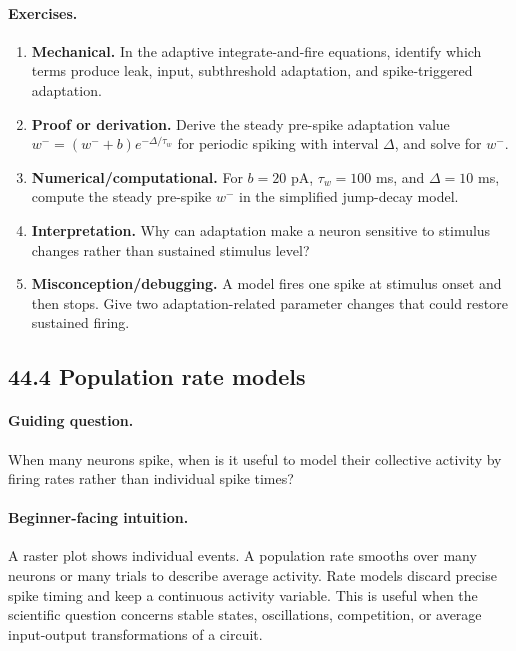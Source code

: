 \paragraph{Exercises.}
\begin{enumerate}[label=\textbf{44.3.\arabic*.}, leftmargin=*]
\item \textbf{Mechanical.} In the adaptive integrate-and-fire equations, identify which terms produce leak, input, subthreshold adaptation, and spike-triggered adaptation.
\item \textbf{Proof or derivation.} Derive the steady pre-spike adaptation value \(w^-=(w^-+b)e^{-\Delta/\tau_w}\) for periodic spiking with interval \(\Delta\), and solve for \(w^-\).
\item \textbf{Numerical/computational.} For \(b=20\) pA, \(\tau_w=100\) ms, and \(\Delta=10\) ms, compute the steady pre-spike \(w^-\) in the simplified jump-decay model.
\item \textbf{Interpretation.} Why can adaptation make a neuron sensitive to stimulus changes rather than sustained stimulus level?
\item \textbf{Misconception/debugging.} A model fires one spike at stimulus onset and then stops. Give two adaptation-related parameter changes that could restore sustained firing.
\end{enumerate}

\subsection{44.4 Population rate models}

\paragraph{Guiding question.}
When many neurons spike, when is it useful to model their collective activity by firing rates rather than individual spike times?

\paragraph{Beginner-facing intuition.}
A raster plot shows individual events. A population rate smooths over many neurons or many trials to describe average activity. Rate models discard precise spike timing and keep a continuous activity variable. This is useful when the scientific question concerns stable states, oscillations, competition, or average input-output transformations of a circuit.

